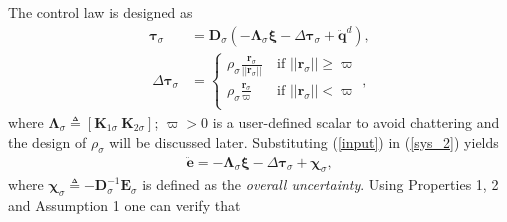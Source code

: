 The control law is designed as
\begin{subequations}\label{split_input}
	\begin{align} 
	\boldsymbol \tau_{\sigma} & = \mathbf D_\sigma (-\boldsymbol{\Lambda}_{\sigma} \boldsymbol{ \xi} -\Delta \boldsymbol \tau_{\sigma}+ \ddot{\mathbf{q}}^d),   \label{input}\\
	~ \Delta \boldsymbol \tau_{\sigma}&=\begin{cases}
	{\rho_\sigma}\frac{\mathbf r_\sigma}{|| \mathbf r_\sigma||}       & ~ \text{if } || \mathbf r_\sigma|| \geq \varpi\\
	{\rho_\sigma}\frac{\mathbf r_\sigma}{\varpi}        & ~ \text{if } || \mathbf r_\sigma || < \varpi\\
	\end{cases}, \label{rob}
	\end{align}
\end{subequations}
where $\boldsymbol \Lambda_{\sigma} \triangleq [\mathbf K_{1\sigma}~\mathbf K_{2\sigma}] $; $\varpi >0$ is a user-defined scalar to avoid chattering and the %
design of $\rho_\sigma$ will be discussed later.
Substituting (\ref{input}) in (\ref{sys_2}) yields
\begin{align}
\ddot{\mathbf e}  = -\boldsymbol{\Lambda}_{\sigma} \boldsymbol{ \xi} - \Delta \boldsymbol \tau_{\sigma}+\boldsymbol \chi_{\sigma}, \label{e_ddot}
\end{align}
where $\boldsymbol \chi_{\sigma} \triangleq -\mathbf D_\sigma^{-1} \mathbf{E}_{\sigma}$ is defined as the \emph{overall uncertainty}. Using Properties 1, 2 and Assumption 1 one can verify that 
